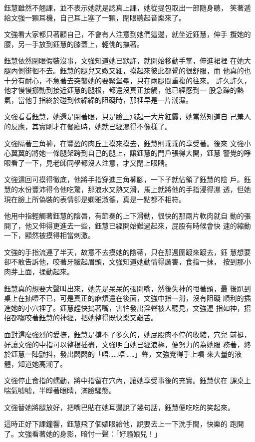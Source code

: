 鈺慧雖然不翹課，並不表示她就是認真上課，她從提包取出一部隨身聽，
笑著遞給文強一顆耳機，自己耳上塞了一顆，閉眼聽起音樂來了。

文強看大家都只著顧自己，不會有人注意到她們這邊，就坐近鈺慧，伸手
攬她的腰，另一手放到鈺慧的膝蓋上，輕佻的撫著。

鈺慧依然閉眼假裝沒事，文強知道她已默許，就開始移動手掌，伸進裙裡
在她大腿內側徘徊不去。鈺慧的腿兒又嫩又細，摸起來彼此都覺的很舒服，而
他真的也十分有耐心，不急著去突襲她的要緊堡壘，只在兩腿間重複的往來。
許久許久，他才慢慢挪動到接近鈺慧的腿根，都還沒真正接觸，他已經感到一
股急躁的熱氣，當他手指終於碰到軟綿綿的阻礙時，那裡早是一片潮濕。

文強看看鈺慧，她還是閉著眼，只是臉上飛起一大片紅霞，她當然知道自
己羞人的反應，其實剛才在餐廳時，她就已經濕得不像樣了。

文強隔著三角褲，在豐盈的肉丘上摸來摸去，鈺慧則乖乖的享受著。後來
文強小心翼翼的將她一條腿架跨到自己的腿上，讓鈺慧的門戶張得大開，鈺慧
警覺的睜眼看了一下，見老師同學都沒人注意，才又閉上眼睛。

文強這回可摸得徹底，他將手指穿進三角褲腳，一下子就佔領了鈺慧的陰
戶。鈺慧的水份豐沛得令他吃驚，那浪水又熱又滑，馬上就將他的手指浸得濕
透，但她現在臉上所偽裝的表情卻是嫻雅淑德，真是一點都不相符。

他用中指輕觸著鈺慧的陰唇，有節奏的上下滑動，很快的那兩片軟肉就自
動的張開了，他又伸得更進去一些，鈺慧已經開始難過起來，屁股有時候會快
速的縮動一下，顯然被摸得相當刺激。

文強的手指流連了半天，故意不去摸她的陰蒂，只在那週圍踱來踱去，鈺
慧想要卻不敢告訴他，咬著牙皺起眉頭，文強知道她動情得厲害，食指一抹，
按到那小肉芽上面，揉動起來。

鈺慧真的想要大聲叫出來，她先是呆呆的張開嘴，然後失神的甩著頭，最
後趴到桌上在抽噎不已，可是真正的麻煩還在後面，文強中指一滑，沒有阻礙
順利的插進她的小穴裡了。鈺慧趕快摀著嘴，害怕發出淫聲被人聽見，文強運
指如神，招招都囓咬著鈺慧的神經，把她整得既快樂又艱苦。

面對這麼強烈的愛撫，鈺慧是撐不了多久的，她屁股肉不停的收縮，穴兒
前挺，好讓文強的中指可以整根插盡，文強明白她已經浪極，便努力的為她服
務著，終於鈺慧一陣顫抖，發出悶悶的「唔……唔……」聲，文強覺得手上噴
來大量的液體，知道她高潮了。

文強停止食指的蠕動，將中指留在穴內，讓她享受事後的充實。鈺慧伏在
課桌上喘氣噓噓，半睜著眼睛，滿臉騷態。

文強替她將腿放好，把嘴巴貼在她耳邊說了幾句話，鈺慧便吃吃的笑起來。

這時正好下課鐘響，鈺慧飛了個媚眼給他，說要去上一下洗手間，快樂的
跑開了。文強看著她的身影，暗忖一聲：「好騷娘兒！」

